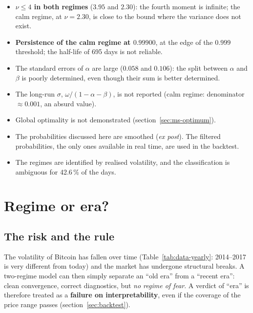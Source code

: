 \documentclass[12pt,a4paper]{article}
\begin{document}
\begin{itemize}
	\item \textbf{$\nu \le 4$ in both regimes} ($3.95$ and $2.30$): the fourth moment is infinite; the calm regime, at $\nu = 2.30$, is close to the bound where the variance does not exist.
	\item \textbf{Persistence of the calm regime at $0.99900$}, at the edge of the $0.999$ threshold; the half-life of 695 days is not reliable.
	\item The standard errors of $\alpha$ are large ($0.058$ and $0.106$): the split between $\alpha$ and $\beta$ is poorly determined, even though their sum is better determined.
	\item The long-run $\sigma$, $\omega/(1-\alpha-\beta)$, is not reported (calm regime: denominator $\approx 0.001$, an absurd value).
	\item Global optimality is not demonstrated (section~\ref{sec:ms-optimum}).
	\item The probabilities discussed here are smoothed (\emph{ex post}). The filtered probabilities, the only ones available in real time, are used in the backtest.
	\item The regimes are identified by realised volatility, and the classification is ambiguous for 42.6\,\% of the days.
\end{itemize}


\section{Regime or era?}
\label{sec:era}

\subsection{The risk and the rule}

The volatility of Bitcoin has fallen over time (Table~\ref{tab:data-yearly}: 2014--2017 is very different from today) and the market has undergone structural breaks. A two-regime model can then simply separate an ``old era'' from a ``recent era'': clean convergence, correct diagnostics, but \emph{no regime of fear}. A verdict of ``era'' is therefore treated as a \textbf{failure on interpretability}, even if the coverage of the price range passes (section~\ref{sec:backtest}).
\end{document}
